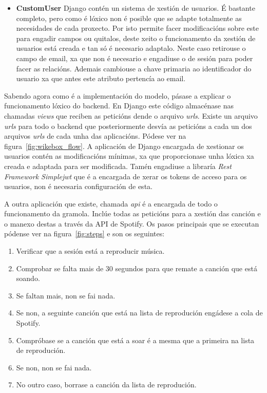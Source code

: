 \begin{itemize}
	\item \textbf{CustomUser} Django contén un sistema de xestión de usuarios. É bastante completo, pero como é lóxico non é posible que se adapte totalmente as necesidades de cada proxecto. Por isto permite facer modificacións sobre este para engadir campos ou quitalos, deste xeito o funcionamento da xestión de usuarios está creada e tan só é necesario adaptalo. Neste caso retirouse o campo de email, xa que non é necesario e engadiuse o de sesión para poder facer as relacións. Ademais cambiouse a chave primaria ao identificador do usuario xa que antes este atributo pertencía ao email.

\end{itemize}

Sabendo agora como é a implementación do modelo, pásase a explicar o funcionamento lóxico do backend. En Django este código almacénase nas chamadas \textit{views} que reciben as peticións dende o arquivo \textit{urls}. Existe un arquivo \textit{urls} para todo o backend que posteriormente desvía as peticións a cada un dos arquivos \textit{urls} de cada unha das aplicacións. Pódese ver na figura~\ref{fig:wikebox_flow}.\smallbreak
A aplicación de Django encargada de xestionar os usuarios contén as modificacións mínimas, xa que proporcionase unha lóxica xa creada e adaptada para ser modificada. Tamén engadiuse a libraría \textit{Rest Framework Simplejwt} que é a encargada de xerar os tokens de acceso para os usuarios, non é necesaria configuración de esta.\smallbreak

A outra aplicación que existe, chamada \textit{api} é a encargada de todo o funcionamento da gramola. Inclúe todas as peticións para a xestión das canción e o manexo destas a través da API de Spotify. Os pasos principais que se executan pódense ver na figura~\ref{fig:steps} e son os seguintes:

\begin{enumerate}
	\item Verificar que a sesión está a reproducir música.
	\item Comprobar se falta mais de 30 segundos para que remate a canción que está soando.
	\item Se faltan mais, non se fai nada.
	\item Se non, a seguinte canción que está na lista de reprodución engádese a cola de Spotify.
	\item Compróbase se a canción que está a soar é a mesma que a primeira na lista de reprodución.
	\item Se non, non se fai nada.
	\item No outro caso, borrase a canción da lista de reprodución.
\end{enumerate}

